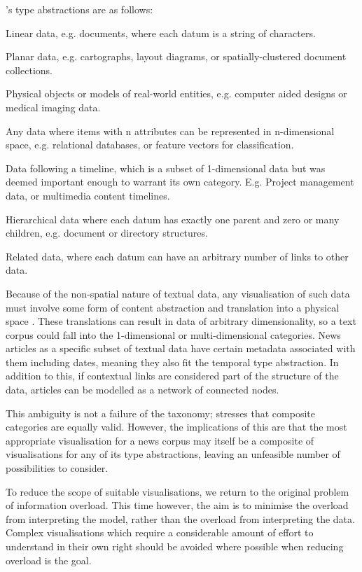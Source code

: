 \citeauthor{TheEyesHaveIt}'s type abstractions are as follows:
\begin{description}[leftmargin=11em,style=nextline]
	\item [1-dimensional] Linear data, e.g. documents, where each datum is a string of characters.
	\item[2-dimensional] Planar data, e.g. cartographs, layout diagrams, or spatially-clustered document collections.
	\item[3-dimensional] Physical objects or models of real-world entities, e.g. computer aided designs or medical imaging data.
	\item[Multi-dimensional] Any data where items with n attributes can be represented in n-dimensional space, e.g. relational databases, or feature vectors for classification.
	\item[Temporal] Data following a timeline, which is a subset of 1-dimensional data but was deemed important enough to warrant its own category. E.g. Project management data, or multimedia content timelines.
	\item[Tree] Hierarchical data where each datum has exactly one parent and zero or many children, e.g. document or directory structures.
	\item[Network] Related data, where each datum can have an arbitrary number of links to other data.
\end{description}

Because of the non-spatial nature of textual data, any visualisation of such data must involve some form of content abstraction and translation into a physical space \citep{VisualizingTheNonVisual}. These translations can result in data of arbitrary dimensionality, so a text corpus could fall into the 1-dimensional or multi-dimensional categories. News articles as a specific subset of textual data have certain metadata associated with them including dates, meaning they also fit the temporal type abstraction. In addition to this, if contextual links are considered part of the structure of the data, articles can be modelled as a network of connected nodes.

This ambiguity is not a failure of the taxonomy; \citeauthor{TheEyesHaveIt} stresses that composite categories are equally valid. However, the implications of this are that the most appropriate visualisation for a news corpus may itself be a composite of visualisations for any of its type abstractions, leaving an unfeasible number of possibilities to consider. 

To reduce the scope of suitable visualisations, we return to the original problem of information overload. This time however, the aim is to minimise the overload from interpreting the model, rather than the overload from interpreting the data. Complex visualisations which require a considerable amount of effort to understand in their own right should be avoided where possible when reducing overload is the goal.


